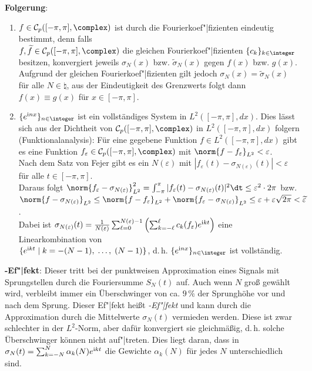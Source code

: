\textbf{Folgerung}:
\begin{enumerate}
    \item
    $f \in \C_p([-\pi, \pi], \complex)$ ist durch die Fourierkoef"|fizienten
    eindeutig bestimmt, denn falls\\
    $f, \widetilde{f} \in \C_p([-\pi, \pi], \complex)$
    die gleichen Fourierkoef"|fizienten
    $\{c_k\}_{k \in \integer}$ besitzen, konvergiert jeweils
    $\sigma_N(x)$ bzw. $\widetilde{\sigma}_N(x)$ gegen $f(x)$ bzw. $g(x)$.
    Aufgrund der gleichen Fourierkoef"|fizienten gilt jedoch
    $\sigma_N(x) = \widetilde{\sigma}_N(x)$ für alle $N \in \natural$,
    aus der Eindeutigkeit des Grenzwerts folgt dann $f(x) \equiv g(x)$
    für $x \in [-\pi, \pi]$.

    \item
    $\{e^{\i nx}\}_{n \in \integer}$ ist ein vollständiges System in
    $L^2([-\pi, \pi], dx)$.
    Dies lässt sich aus der Dichtheit von $\C_p([-\pi, \pi], \complex)$ in
    $L^2([-\pi, \pi], dx)$ folgern (Funktionalanalysis):
    Für eine gegebene Funktion $f \in L^2([-\pi, \pi], dx)$
    gibt es eine Funktion $f_\varepsilon \in \C_p([-\pi, \pi], \complex)$
    mit $\norm{f - f_\varepsilon}_{L^2} < \varepsilon$.\\
    Nach dem Satz von Fejer gibt es ein $N(\varepsilon)$ mit
    $|f_\varepsilon(t) - \sigma_{N(\varepsilon)}(t)| < \varepsilon$ für alle
    $t \in [-\pi, \pi]$.\\
    Daraus folgt
    $\norm{f_\varepsilon - \sigma_{N(\varepsilon)}}_{L^2}^2 =
    \int_{-\pi}^\pi |f_\varepsilon(t) - \sigma_{N(\varepsilon)}(t)|^2 \dt \le
    \varepsilon^2 \cdot 2\pi$ bzw.\\
    $\norm{f - \sigma_{N(\varepsilon)}}_{L^2} \le
    \norm{f - f_\varepsilon}_{L^2} +
    \norm{f_\varepsilon - \sigma_{N(\varepsilon)}}_{L^2} \le
    \varepsilon + \varepsilon \sqrt{2\pi} < \widetilde{\varepsilon}$.\\
    Dabei ist $\sigma_{N(\varepsilon)}(t) =
    \frac{1}{N(\varepsilon)} \sum_{\ell=0}^{N(\varepsilon)-1}
    \left(\sum_{k=-\ell}^\ell c_k(f_\varepsilon) e^{\mathrm{i} kt}\right)$
    eine Linearkombination von\\
    $\{e^{\mathrm{i} kt} \;|\; k = -(N-1),\; \dotsc,\; (N-1)\}$, d.\,h.
    $\{e^{\i nx}\}_{n \in \integer}$ ist vollständig.
\end{enumerate}

\linie

\textbf{-Ef"|fekt}:
Dieser tritt bei der punktweisen Approximation eines Signals mit
Sprungstellen durch die Fouriersumme $S_N(t)$ auf.
Auch wenn $N$ groß gewählt wird, verbleibt immer ein Überschwinger von ca.
$9\,\%$ der Sprunghöhe vor und nach dem Sprung.
Dieser Ef"|fekt heißt \emph{-Ef"|fekt} und kann durch die
Approximation durch die Mittelwerte $\sigma_N(t)$ vermieden werden.
Diese ist zwar schlechter in der $L^2$-Norm, aber dafür konvergiert sie
gleichmäßig, d.\,h. solche Überschwinger können nicht auf"|treten.
Dies liegt daran, dass in $\sigma_N(t) = \sum_{k=-N}^N \alpha_k(N) e^{\mathrm{i} kt}$
die Gewichte $\alpha_k(N)$ für jedes $N$ unterschiedlich sind.

